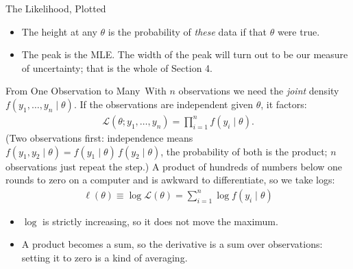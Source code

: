 \documentclass[aspectratio=169,11pt,xcolor=dvipsnames]{beamer}
\newcommand{\lik}{\mathcal{L}}
\newcommand{\loglik}{\ell}
\newcommand{\core}{\,\raisebox{0.6pt}{\textcolor{corestar}{$\bigstar$}}}
\begin{document}
\begin{frame}{The Likelihood, Plotted}
\begin{center}
\end{center}
\vskip-4pt
\begin{itemize}\itemsep2pt
  \item The height at any $\theta$ is the probability of \emph{these} data if that
        $\theta$ were true.
  \item The peak is the MLE. The \alert{width} of the peak will turn out to be our
        measure of uncertainty; that is the whole of Section 4.
\end{itemize}
\end{frame}

\begin{frame}{From One Observation to Many\core}
With $n$ observations we need the \emph{joint} density
$f(y_1,\dots,y_n\mid\theta)$. If the observations are independent given $\theta$,
it factors:
\begin{align*}
  \lik(\theta; y_1,\dots,y_n) = \prod_{i=1}^{n} f(y_i \mid \theta) .
\end{align*}
{\footnotesize (Two observations first: independence means
$f(y_1, y_2 \mid \theta) = f(y_1 \mid \theta)\, f(y_2 \mid \theta)$, the
probability of both is the product; $n$ observations just repeat the step.)}
\pause
A product of hundreds of numbers below one rounds to zero on a computer
and is awkward to differentiate, so we take logs:
\begin{align*}
  \boxed{\;\loglik(\theta) \equiv \log \lik(\theta) = \sum_{i=1}^{n}\log f(y_i\mid\theta)\;}
\end{align*}
\vskip2pt
\begin{itemize}\itemsep2pt
  \item $\log$ is strictly increasing, so it \alert{does not move the maximum}.
  \item A product becomes a sum, so the derivative is a sum over
        observations: setting it to zero is a kind of averaging.
\end{itemize}
\end{frame}
\end{document}
